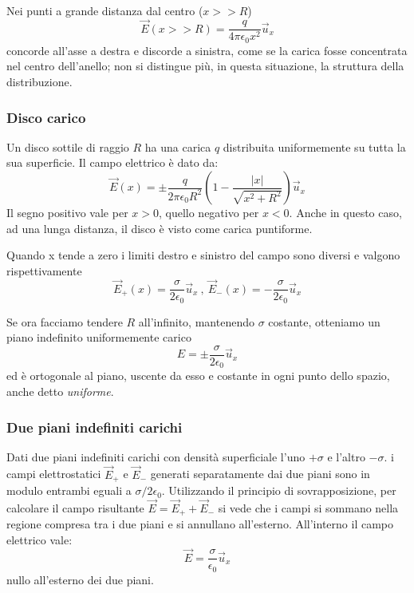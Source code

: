 \documentclass[class=book, crop=false, oneside, 12pt]{standalone}
\begin{document}
Nei punti a grande distanza dal centro (\(x >> R\)) 
\begin{equation*}
    \overrightarrow{E} (x>>R) =\frac{q}{4 \pi \epsilon_0 x^2} \overrightarrow{u}_x
\end{equation*}
concorde all'asse a destra e discorde a sinistra, come se la carica fosse concentrata nel centro dell'anello; non si distingue più, in questa situazione, la struttura della distribuzione.

\subsubsection*{Disco carico}

Un disco sottile di raggio \(R\) ha una carica \(q\) distribuita uniformemente su tutta la sua superficie.  
Il campo elettrico è dato da:
\begin{equation*}
    \overrightarrow{E} (x) = \pm \frac{q}{2 \pi \epsilon_0 R^2} \left(1 - \frac{|x|}{\sqrt{x^2 + R^2}}\right) \overrightarrow{u}_x
\end{equation*}
Il segno positivo vale per \(x > 0\), quello negativo per \(x < 0\).  
Anche in questo caso, ad una lunga distanza, il disco è visto come carica puntiforme.  

Quando x tende a zero i limiti destro e sinistro del campo sono diversi e valgono rispettivamente
\begin{equation*}
    \overrightarrow{E}_{+} (x) = \frac{\sigma}{2 \epsilon_0} \overrightarrow{u}_x \ , \ \overrightarrow{E}_{-} (x) = - \frac{\sigma}{2 \epsilon_0} \overrightarrow{u}_x 
\end{equation*}

Se ora facciamo tendere \(R\) all'infinito, mantenendo \(\sigma\) costante, otteniamo un piano indefinito uniformemente carico
\begin{equation*}
    E = \pm \frac{\sigma}{2 \epsilon_0} \overrightarrow{u}_x
\end{equation*}
ed è ortogonale al piano, uscente da esso e costante in ogni punto dello spazio, anche detto \emph{uniforme}.

\subsubsection*{Due piani indefiniti carichi}
Dati due piani indefiniti carichi con densità superficiale l'uno \(+ \sigma\) e l'altro \(- \sigma\).
i campi elettrostatici \(\overrightarrow{E}_{+}\) e \(\overrightarrow{E}_{-}\) generati separatamente dai due piani sono in modulo entrambi eguali a \(\sigma / 2 \epsilon_0\).
Utilizzando il principio di sovrapposizione, per calcolare il campo risultante \(\overrightarrow{E} = \overrightarrow{E}_{+} + \overrightarrow{E}_{-}\) si vede che i campi si sommano nella regione compresa tra i due piani e si annullano all'esterno.  
All'interno il campo elettrico vale:
\begin{equation*}
    \overrightarrow{E} = \frac{\sigma}{\epsilon_0} \overrightarrow{u}_x
\end{equation*}
nullo all'esterno dei due piani.
\end{document}
